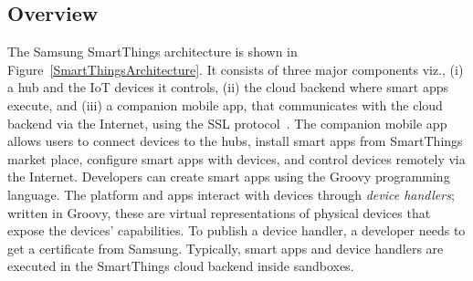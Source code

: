 \subsection{Overview}
{\color{black}The Samsung SmartThings architecture is shown in Figure~\ref{SmartThingsArchitecture}.
It consists of three major components viz., (i) a hub and the IoT devices it controls, (ii) the cloud backend where smart apps execute, and (iii) a companion mobile app, that communicates with the cloud backend via the
Internet, using the SSL protocol~\cite{Brian:internreport}.
The companion mobile app allows users to
connect devices to the hubs,
install smart apps from SmartThings market place,
configure smart apps with devices, and control devices remotely via the Internet.}
Developers can create smart apps using the Groovy programming language.
The platform and apps interact with devices through {\em device handlers};
written in Groovy, these are
virtual representations of physical devices that
expose the devices' capabilities.
To publish a device handler, a developer needs to get a certificate from Samsung.
Typically, smart apps and device handlers are executed in the SmartThings cloud backend
inside sandboxes.

